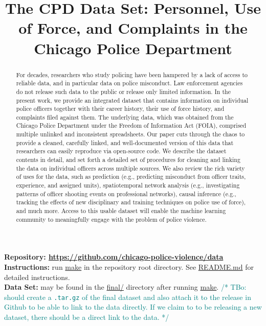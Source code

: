\documentclass{article}
\title{The CPD Data Set: Personnel, Use of Force, and Complaints in the Chicago Police Department}
\newcommand{\tbo}[1]{\textcolor{teal}{/* TBo: #1 */}}
\begin{document}
\maketitle

\begin{abstract}
For decades, researchers who study policing have been hampered by a lack of
access to reliable data, and in particular data on police misconduct. Law
enforcement agencies do not release such data to the public or release only
limited information. In the present work, we provide an integrated dataset that
contains information on individual police officers together with their career
history, their use of force history, and complaints filed against them. The
underlying data, which was obtained from the Chicago Police Department under
the Freedom of Information Act (FOIA), comprised multiple unlinked and
inconsistent spreadsheets. Our paper cuts through the chaos to provide
a cleaned, carefully linked, and well-documented version of this data that
researchers can easily reproduce via open-source code. We describe the dataset
contents in detail, and set forth a detailed set of procedures for cleaning and
linking the data on individual officers across multiple sources. We also review
the rich variety of uses for the data, such as prediction (e.g., predicting
misconduct from officer traits, experience, and assigned units), spatiotemporal
network analysis (e.g., investigating patterns of officer shooting events on
professional networks), causal inference (e.g., tracking the effects of new
disciplinary and training techniques on police use of force), and much more.
Access to this usable dataset will enable the machine learning community to
meaningfully engage with the problem of police violence.
\end{abstract}

\textbf{Repository: \url{https://github.com/chicago-police-violence/data}}\\
\textbf{Instructions:} run \url{make} in the repository root directory. See \url{README.md} for detailed instructions.\\
\textbf{Data Set:} may be found in the \url{final/} directory after running \url{make}.
\tbo{should create a \texttt{.tar.gz} of the final dataset and also attach it
to the release in Github to be able to link to the data directly. If we claim
to to be releasing a new dataset, there should be a direct link to the data.}














\appendix






\end{document}
